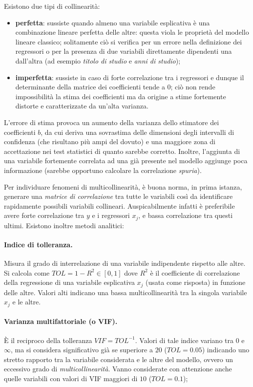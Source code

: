 \documentclass[a4page, 11pt]{article} %
\begin{document}
Esistono due tipi di collinearità:
\begin{itemize}[noitemsep]
  \item \textbf{perfetta}: sussiste quando almeno una variabile esplicativa è una combinazione lineare perfetta delle altre: questa viola le proprietà del modello lineare classico; solitamente ciò si verifica per un errore nella definizione dei regressori o per la presenza di due variabili direttamente dipendenti una dall'altra (ad esempio \textit{titolo di studio} e \textit{anni di studio});
  \item \textbf{imperfetta}: sussiste in caso di forte correlazione tra i regressori e dunque il determinante della matrice dei coefficienti tende a $0$; ciò non rende impossibilità la stima dei coefficienti ma da origine a stime fortemente distorte e caratterizzate da un'alta varianza.
\end{itemize}

L'errore di stima provoca un aumento della varianza dello stimatore dei coefficienti $b$, da cui deriva una sovrastima delle dimensioni degli intervalli di confidenza (che risultano più ampi del dovuto) e una maggiore zona di accettazione nei test statistici di quanto sarebbe corretto.
Inoltre, l'aggiunta di una variabile fortemente correlata ad una già presente nel modello aggiunge poca informazione (sarebbe opportuno calcolare la correlazione \textit{spuria}).

Per individuare fenomeni di multicollinearità, è buona norma, in prima istanza, generare una \textit{matrice di correlazione} tra tutte le variabili così da identificare rapidamente possibili variabili collineari.
Auspicabilmente infatti è preferibile avere forte correlazione tra $y$ e i regressori $x_j$, e bassa correlazione tra questi ultimi.
Esistono inoltre metodi analitici:

\paragraph{Indice di tolleranza.} Misura il grado di interrelazione di una variabile indipendente rispetto alle altre.
Si calcola come $TOL = 1 - R^2 \in [0, 1]$ dove $R^2$ è il coefficiente di correlazione della regressione di una variabile esplicativa $x_j$ (usata come risposta) in funzione delle altre.
Valori alti indicano una bassa multicollinearità tra la singola variabile $x_j$ e le altre.

\paragraph{Varianza multifattoriale (o VIF).} È il reciproco della tolleranza $VIF = TOL^{-1}$.
Valori di tale indice variano tra $0$ e $\infty$, ma si considera significativo già se superiore a $20$ ($TOL = 0.05$) indicando uno stretto rapporto tra la variabile considerata e le altre del modello, ovvero un eccessivo grado di \textit{multicollinearità}.
Vanno considerate con attenzione anche quelle variabili con valori di VIF maggiori di $10$ ($TOL = 0.1$);
\end{document}
